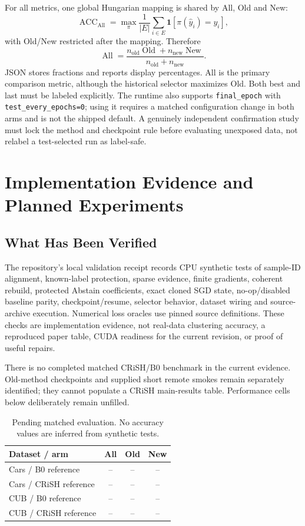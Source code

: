 \documentclass[conference]{IEEEtran}
\newcommand{\code}[1]{\texttt{#1}}
\newcommand{\ind}{\mathbf{1}}
\begin{document}
For all metrics, one global Hungarian mapping is shared by All, Old and New:
\begin{equation}
\operatorname{ACC}_{\mathrm{All}}=\max_{\pi}\frac1{|E|}
\sum_{i\in E}\ind[\pi(\hat y_i)=y_i],
\end{equation}
with Old/New restricted after the mapping. Therefore
\begin{equation}
\operatorname{All}=\frac{n_{\mathrm{old}}\operatorname{Old}+n_{\mathrm{new}}\operatorname{New}}
{n_{\mathrm{old}}+n_{\mathrm{new}}}.
\end{equation}
JSON stores fractions and reports display percentages. All is the primary comparison metric, although the historical selector maximizes Old. Both best and last must be labeled explicitly. The runtime also supports \code{final\_epoch} with \code{test\_every\_epochs=0}; using it requires a matched configuration change in both arms and is not the shipped default. A genuinely independent confirmation study must lock the method and checkpoint rule before evaluating unexposed data, not relabel a test-selected run as label-safe.

\section{Implementation Evidence and Planned Experiments}
\subsection{What Has Been Verified}
The repository's local validation receipt records CPU synthetic tests of sample-ID alignment, known-label protection, sparse evidence, finite gradients, coherent rebuild, protected Abstain coefficients, exact cloned SGD state, no-op/disabled baseline parity, checkpoint/resume, selector behavior, dataset wiring and source-archive execution. Numerical loss oracles use pinned source definitions. These checks are implementation evidence, not real-data clustering accuracy, a reproduced paper table, CUDA readiness for the current revision, or proof of useful repairs.

There is no completed matched CRiSH/B0 benchmark in the current evidence. Old-method checkpoints and supplied short remote smokes remain separately identified; they cannot populate a CRiSH main-results table. Performance cells below deliberately remain unfilled.
\begin{table}[!t]\small\centering
\caption{Pending matched evaluation. No accuracy values are inferred from synthetic tests.}
\begin{tabular}{lccc}\toprule
Dataset / arm & All & Old & New\\\midrule
Cars / B0 reference & -- & -- & --\\
Cars / CRiSH reference & -- & -- & --\\
CUB / B0 reference & -- & -- & --\\
CUB / CRiSH reference & -- & -- & --\\\bottomrule
\end{tabular}\label{tab:pending}
\end{table}
\end{document}
